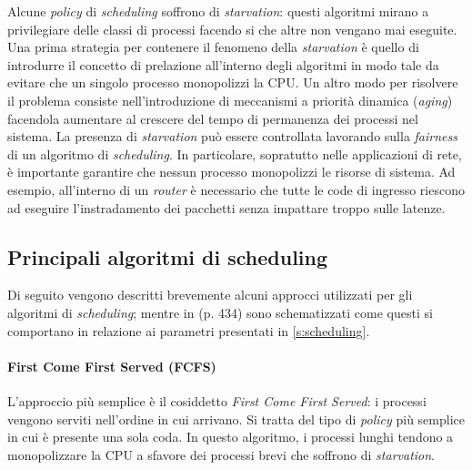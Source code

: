 Alcune \textit{policy} di \textit{scheduling} soffrono di \textit{starvation}\cite{stallingsos}: questi algoritmi mirano a privilegiare delle classi di processi facendo si che altre non vengano mai eseguite. Una prima strategia per contenere il fenomeno della \textit{starvation} è quello di introdurre il concetto di prelazione all'interno degli algoritmi in modo tale da evitare che un singolo processo monopolizzi la CPU. Un altro modo per risolvere il problema consiste nell'introduzione di meccanismi a priorità dinamica (\textit{aging}) facendola aumentare al crescere del tempo di permanenza dei processi nel sistema. La presenza di \textit{starvation} può essere controllata lavorando sulla \textit{fairness} di un algoritmo di \textit{scheduling}. In particolare, sopratutto nelle applicazioni di rete, è importante garantire che nessun processo monopolizzi le risorse di sistema. Ad esempio, all'interno di un \textit{router} è necessario che tutte le code di ingresso riescono ad eseguire l'instradamento dei pacchetti senza impattare troppo sulle latenze.

\subsection{Principali algoritmi di scheduling}

Di seguito vengono descritti brevemente alcuni approcci utilizzati per gli algoritmi di \textit{scheduling}; mentre in \cite{stallingsos}(p. 434) sono schematizzati come questi si comportano in relazione ai parametri presentati in \cref{s:scheduling}.

\paragraph{First Come First Served (FCFS)}
L'approccio più semplice è il cosiddetto \textit{First Come First Served}: i processi vengono serviti nell'ordine in cui arrivano. Si tratta del tipo di \textit{policy} più semplice in cui è presente una sola coda. In questo algoritmo, i processi lunghi tendono a monopolizzare la CPU a sfavore dei processi brevi che soffrono di \textit{starvation}.

